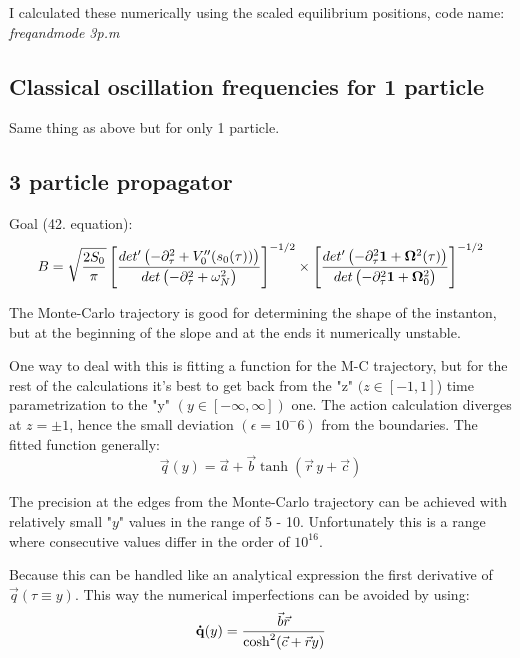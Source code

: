 \documentclass[12pt,a4paper]{article}
\numberwithin{equation}{section}
\begin{document}
I calculated these numerically using the scaled equilibrium positions, code name: \textit{freqandmode 3p.m}

\subsection{Classical oscillation frequencies for 1 particle}
Same thing as above but for only 1 particle.

\subsection{3 particle propagator}

Goal (42. equation):
\begin{equation}
B = \sqrt{ \frac{2S_0}{\pi}} \left[ \frac{det^\prime \left(-\partial_\tau^2 + V^{\prime \prime}_0 (s_0 (\tau))   \right)}{det\left(-\partial_\tau^2 + \omega^2_N   \right)}  \right]^{-1/2} \times \left[  \frac{det^\prime \left(-\partial_\tau^2 {\bf{1}} + {\bf{\Omega}}^2 (\tau)   \right)}{det\left(-\partial_\tau^2 {\bf{1}}+ {\bf{\Omega}}^2_0   \right)}   \right]^{-1/2}
\end{equation}

The Monte-Carlo trajectory is good for determining the shape of the instanton, but at the beginning of the slope and at the ends it numerically unstable. 

One way to deal with this is fitting a function for the M-C trajectory, but for the rest of the calculations it's best to get back from the "z" $(z\in [-1,1]$) time parametrization to the "y" $(y \in [-\infty, \infty])$ one. The action calculation diverges at $z=\pm 1$, hence the small deviation $(\epsilon = 10^-6)$ from the boundaries. The fitted function generally:
\begin{equation}
\vec{q}(y) = \vec{a} + \vec{b}\tanh(\vec{r}\, y + \vec{c})
\end{equation}

The precision at the edges from the Monte-Carlo trajectory can be achieved with relatively small "$y$" values in the range of 5 - 10. Unfortunately this is a range where consecutive values differ in the order of $10^{16}$.

Because this can be handled like an analytical expression the first derivative of $\vec{q}(\tau \equiv y)$. This way the numerical imperfections can be avoided by using:
\begin{equation}
{\bf{\dot{q}}}(y) = \frac{\vec{b} \vec{r}}{\cosh^2 (\vec{c} + \vec{r}y)}
\end{equation}
\end{document}
